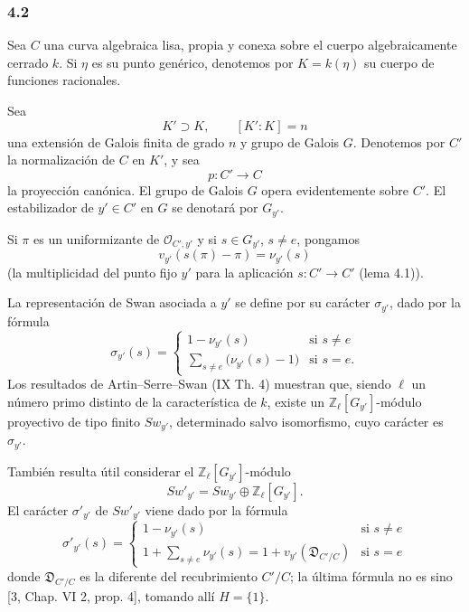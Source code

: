 \subsubsection*{4.2}

Sea $C$ una curva algebraica lisa, propia y conexa sobre el cuerpo algebraicamente cerrado $k$. Si $\eta$ es su punto genérico, denotemos por $K=k(\eta)$ su cuerpo de funciones racionales.

Sea
\[
K'\supset K,\qquad [K':K]=n
\]
una extensión de Galois finita de grado $n$ y grupo de Galois $G$. Denotemos por $C'$ la normalización de $C$ en $K'$, y sea
\[
p:C'\longrightarrow C
\]
la proyección canónica. El grupo de Galois $G$ opera evidentemente sobre $C'$. El estabilizador de $y'\in C'$ en $G$ se denotará por $G_{y'}$.

Si $\pi$ es un uniformizante de $\mathcal O_{C',y'}$ y si $s\in G_{y'}$, $s\ne e$, pongamos
\[
v_{y'}(s(\pi)-\pi)=\nu_{y'}(s)
\tag{4.2.1}
\]
(la multiplicidad del punto fijo $y'$ para la aplicación $s:C'\to C'$ (lema 4.1)).%

La representación de Swan asociada a $y'$ se define por su carácter $\sigma_{y'}$, dado por la fórmula
\[
\sigma_{y'}(s)=
\begin{cases}
1-\nu_{y'}(s)& \text{si } s\ne e\\[0.4em]
\displaystyle\sum_{s\ne e}\bigl(\nu_{y'}(s)-1\bigr)& \text{si } s=e.
\end{cases}
\tag{4.2.2}
\]
Los resultados de Artin--Serre--Swan (IX Th. 4) muestran que, siendo $\ell$ un número primo distinto de la característica de $k$, existe un $\mathbb Z_\ell[G_{y'}]$-módulo proyectivo de tipo finito $Sw_{y'}$, determinado salvo isomorfismo, cuyo carácter es $\sigma_{y'}$.

También resulta útil considerar el $\mathbb Z_\ell[G_{y'}]$-módulo
\[
Sw'_{y'}=Sw_{y'}\oplus\mathbb Z_\ell[G_{y'}].
\tag{4.2.3}
\]
El carácter $\sigma'_{y'}$ de $Sw'_{y'}$ viene dado por la fórmula
\[
\sigma'_{y'}(s)=
\begin{cases}
1-\nu_{y'}(s)& \text{si } s\ne e\\[0.4em]
\displaystyle 1+\sum_{s\ne e}\nu_{y'}(s)
=1+v_{y'}(\mathfrak D_{C'/C})& \text{si } s=e
\end{cases}
\tag{4.2.4}
\]
donde $\mathfrak D_{C'/C}$ es la diferente del recubrimiento $C'/C$; la última fórmula no es sino [3, Chap. VI 2, prop. 4], tomando allí $H=\{1\}$.

